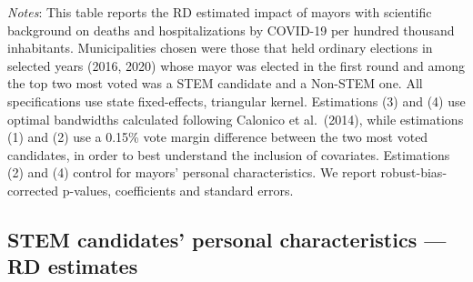 \documentclass[
  letterpaper,
  DIV=11,
  numbers=noendperiod]{scrartcl}
\begin{document}
\emph{Notes}: This table reports the RD estimated impact of mayors with
scientific background on deaths and hospitalizations by COVID-19 per
hundred thousand inhabitants. Municipalities chosen were those that held
ordinary elections in selected years (2016, 2020) whose mayor was
elected in the first round and among the top two most voted was a STEM
candidate and a Non-STEM one. All specifications use state
fixed-effects, triangular kernel. Estimations (3) and (4) use optimal
bandwidths calculated following Calonico et al.~(2014), while
estimations (1) and (2) use a 0.15\% vote margin difference between the
two most voted candidates, in order to best understand the inclusion of
covariates. Estimations (2) and (4) control for mayors' personal
characteristics. We report robust-bias-corrected p-values, coefficients
and standard errors.

\subsection{STEM candidates' personal characteristics --- RD
estimates}\label{stem-candidates-personal-characteristics-rd-estimates}
\end{document}

